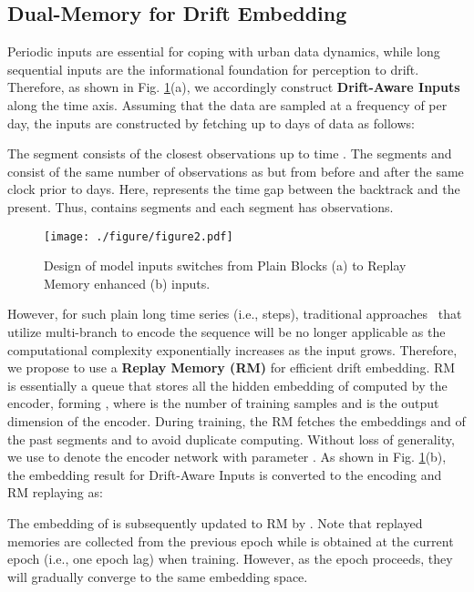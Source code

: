 \documentclass[sigconf]{acmart}
\begin{document}
\subsection{Dual-Memory for Drift Embedding}
Periodic inputs are essential for coping with urban data dynamics, while long sequential inputs are the informational foundation for perception to drift. Therefore, as shown in Fig. \ref{fig:input_structure}(a), we accordingly construct \textbf{Drift-Aware Inputs}  along the time axis. Assuming that the data are sampled at a frequency of  per day, the inputs are constructed by fetching up to  days of data as follows:

The segment  consists of the closest  observations up to time . The segments  and  consist of the same number of observations as  but from before and after the same clock  prior to  days. Here,  represents the time gap between the backtrack and the present. Thus,  contains  segments and  each segment has  observations.

\begin{figure}[h]
	\centering
	\texttt{[image: ./figure/figure2.pdf]}
	\caption{Design of model inputs switches from Plain Blocks (a) to Replay Memory enhanced (b) inputs.}
	\label{fig:input_structure}
\end{figure}

However, for such plain long time series (i.e.,  steps), traditional approaches~\cite{zhang2017deep,guo2019attention,jiang2021deepcrowd} that utilize multi-branch to encode the sequence will be no longer applicable as the computational complexity exponentially increases as the input grows. Therefore, we propose to use a \textbf{Replay Memory (RM)} for efficient drift embedding. RM is essentially a queue that stores all the hidden embedding of  computed by the encoder, forming , where  is the number of training samples and  is the output dimension of the encoder. During training, the RM fetches the embeddings  and  of the past segments  and  to avoid duplicate computing. Without loss of generality, we use  to denote the encoder network with parameter . As shown in Fig. \ref{fig:input_structure}(b), the embedding result  for Drift-Aware Inputs  is converted to the  encoding and RM replaying as:


The embedding of  is subsequently updated to RM by . Note that replayed memories are collected from the previous epoch while  is obtained at the current epoch (i.e., one epoch lag) when training. However, as the epoch proceeds, they will gradually converge to the same embedding space.
\end{document}
